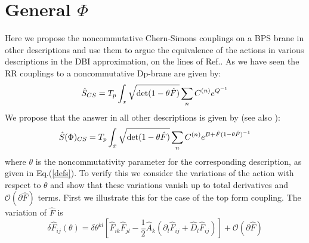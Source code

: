 \documentclass[a4paper,a4paper]{amsproc}
\theoremstyle{definition}
\theoremstyle{remark}
\numberwithin{equation}{section}
\begin{document}
\section{General $\Phi$}

Here we propose the noncommutative Chern-Simons couplings on a BPS
brane in other descriptions and use them to argue the equivalence of
the actions in various descriptions in the DBI approximation, on the
lines of Ref.\cite{SW}. As we have seen the RR couplings to a
noncommutative Dp-brane are given by:
%
\begin{equation}
\hat{S}_{CS} = T_p \int_x {\sqrt{\hbox{det}(1-\theta \hat F)}}
\sum_nC^{(n)}e^{Q^{-1}}
\end{equation}
%
We propose that the answer in all other descriptions is given by (see
also \cite{micheliutwo}):
%
\begin{equation}
\hat{S}(\Phi)_{CS} = T_p \int_x {\sqrt{\hbox{det}(1-\theta \hat F)}}
\sum_nC^{(n)}e^{B+\hat F(1-\theta\hat F)^{-1}}
\end{equation}
%
where $\theta$ is the noncommutativity parameter for the corresponding
description, as given in Eq.(\ref{defs}). To verify this we consider
the variations of the action with respect to $\theta$ and show that
these variations vanish up to total derivatives and
${\mathcal{O}}(\partial{\hat F})$ terms. First we illustrate this for
the case of the top form coupling. The variation of $\hat F$ is
\cite{SW}
%
\begin{equation}
\delta {\hat F}_{ij}(\theta) = \delta\theta^{kl}\left[{\hat
F}_{ik}{\hat F}_{jl} -\frac{1}{2}{\hat A}_k(\partial_l {\hat F}_{ij} +
{\hat D}_l {\hat F}_{ij})\right] + {\mathcal{O}}(\partial{\hat F}) 
\end{equation}
\end{document}

